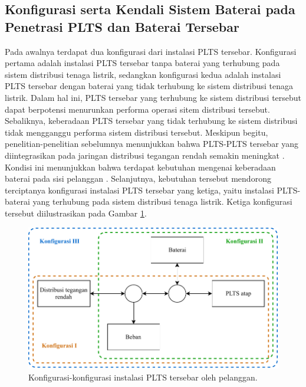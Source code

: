 {{{{\subsection{Konfigurasi serta Kendali Sistem Baterai pada Penetrasi PLTS dan Baterai Tersebar}
Pada awalnya terdapat dua konfigurasi dari instalasi PLTS tersebar. Konfigurasi pertama adalah instalasi PLTS tersebar tanpa baterai yang terhubung pada sistem distribusi tenaga listrik, sedangkan konfigurasi kedua adalah instalasi PLTS tersebar dengan baterai yang tidak terhubung ke sistem distribusi tenaga listrik. Dalam hal ini, PLTS tersebar yang terhubung ke sistem distribusi tersebut dapat berpotensi menurunkan performa operasi sitem distribusi tersebut. Sebaliknya, keberadaan PLTS tersebar yang tidak terhubung ke sistem distribusi tidak mengganggu performa sistem distribusi tersebut. Meskipun begitu, penelitian-penelitian sebelumnya menunjukkan bahwa PLTS-PLTS tersebar yang diintegrasikan pada jaringan distribusi tegangan rendah semakin meningkat \cite{IEApvps2020,irena2020}. Kondisi ini menunjukkan bahwa terdapat kebutuhan mengenai keberadaan baterai pada sisi pelanggan \cite{Nourai2010,Roberts2011}. Selanjutnya, kebutuhan tersebut mendorong terciptanya konfigurasi instalasi PLTS tersebar yang ketiga, yaitu instalasi PLTS-baterai yang terhubung pada sistem distribusi tenaga listrik. Ketiga konfigurasi tersebut diilustrasikan pada Gambar \ref{diagrampltsbateraigrid}.
\begin{figure}[!h]
	\centering
	\includegraphics[width=1\textwidth]{Fig/diagrampltsbateraigrid}
	\caption{Konfigurasi-konfigurasi instalasi PLTS tersebar oleh pelanggan.}
	\label{diagrampltsbateraigrid}
\end{figure}

}}}}
